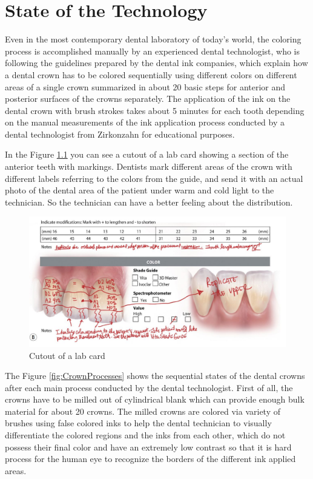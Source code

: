\chapter{State of the Technology}
\label{sec:stand_technik}
Even in the most contemporary dental laboratory of today's world, the coloring process is accomplished manually by an experienced dental technologist, who is following the guidelines prepared by the dental ink companies, which explain how a dental crown has to be colored sequentially using different colors on different areas of a single crown summarized in about 20 basic steps for anterior and posterior surfaces of the crowns separately\citep{idscad2016}. The application of the ink on the dental crown with brush strokes takes about 5 minutes for each tooth depending on the manual measurements of the ink application process conducted by a dental technologist from Zirkonzahn for educational purposes.

In the Figure \ref{fig:lab_card} you can see a cutout of a lab card showing a section of the anterior teeth with markings. Dentists mark different areas of the crown with different labels referring to the colors from the guide, and send it  with an actual photo of the dental area of the patient under warm and cold light to the technician. So the technician can have a better feeling about the distribution.

\bigskip

\begin{figure}[H]
	\centering
	\includegraphics[width=1\textwidth]{grafiken/lab_card.jpg}
			\caption{Cutout of a lab card \citep{sharpling2014}}
	\label{fig:lab_card}
\end{figure}

\bigskip

The Figure \ref{fig:CrownProcesses} shows the sequential states of the dental crowns after each main process conducted by the dental technologist. First of all, the crowns have to be milled out of cylindrical blank which can provide enough bulk material for about 20 crowns. The milled crowns are colored via variety of brushes using  false colored inks to help the dental technician to visually differentiate the colored regions and the inks from each other, which do not possess their final color and have an extremely low contrast so that it is hard process for the human eye to recognize the borders of the different ink applied areas.

